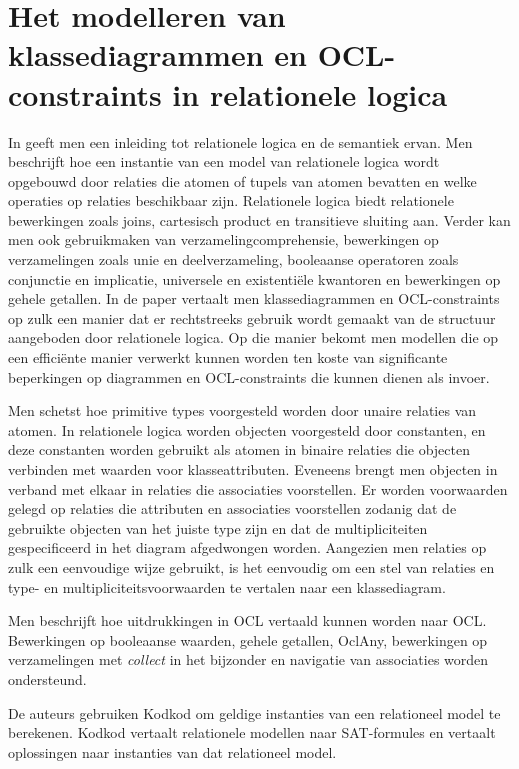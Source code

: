 \section{Het modelleren van klassediagrammen en OCL-constraints in relationele logica}
In \cite{KuhlmannMirco2012FUaO} geeft men een inleiding tot relationele logica en de semantiek ervan. Men beschrijft hoe een instantie van een model van relationele logica wordt opgebouwd door relaties die atomen of tupels van atomen bevatten en welke operaties op relaties beschikbaar zijn. Relationele logica biedt relationele bewerkingen zoals joins, cartesisch product en transitieve sluiting aan. Verder kan men ook gebruikmaken van verzamelingcomprehensie, bewerkingen op verzamelingen zoals unie en deelverzameling, booleaanse operatoren zoals conjunctie en implicatie, universele en existenti\"ele kwantoren en bewerkingen op gehele getallen. In de paper vertaalt men klassediagrammen en OCL-constraints\cite{WarmerJosB1999Ocl:}  op zulk een manier dat er rechtstreeks gebruik wordt gemaakt van de structuur aangeboden door relationele logica. Op die manier bekomt men modellen die op een effici\"ente manier verwerkt kunnen worden ten koste van significante beperkingen op diagrammen en OCL-constraints die kunnen dienen als invoer.

Men schetst hoe primitive types voorgesteld worden door unaire relaties van atomen. In relationele logica worden objecten voorgesteld door constanten, en deze constanten worden gebruikt als atomen in binaire relaties die objecten verbinden met waarden voor klasseattributen. Eveneens brengt men objecten in verband met elkaar in relaties die associaties voorstellen. Er worden voorwaarden gelegd op relaties die attributen en associaties voorstellen zodanig dat de gebruikte objecten van het juiste type zijn en dat de multipliciteiten gespecificeerd in het diagram afgedwongen worden. Aangezien men relaties op zulk een eenvoudige wijze gebruikt, is het eenvoudig om een stel van relaties en type- en multipliciteitsvoorwaarden te vertalen naar een klassediagram.

Men beschrijft hoe uitdrukkingen in OCL vertaald kunnen worden naar OCL. Bewerkingen op booleaanse waarden, gehele getallen, OclAny\cite{WarmerJosB1999Ocl:}, bewerkingen op verzamelingen met \textit{collect} in het bijzonder en navigatie van associaties worden ondersteund.

De auteurs gebruiken Kodkod\cite{10.1007/978-3-540-71209-1_49} om geldige instanties van een relationeel model te berekenen. Kodkod vertaalt relationele modellen naar SAT-formules en vertaalt oplossingen naar instanties van dat relationeel model.

